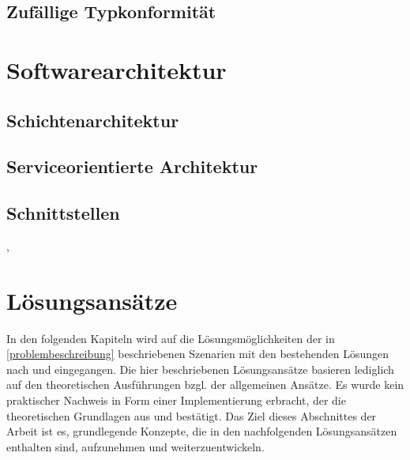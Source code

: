 \documentclass[11pt, 
ngerman,
doublespacing,
chapterinoneline, %
consistentlayout, %
]{scrartcl}
\begin{document}
\subsection{Zufällige Typkonformität}
\cite{structconfjava}
\section{Softwarearchitektur}
\cite{Bas13}
\subsection{Schichtenarchitektur}\label{architektur}
\cite{modanwendungen}
\subsection{Serviceorientierte Architektur}\label{sarchitektur}
\cite{modanwendungen}
\subsection{Schnittstellen}
\cite{Bas13}, \cite{Bus96}
\section{Lösungsansätze}
In den folgenden Kapiteln wird auf die Lösungsmöglichkeiten der in \ref{problembeschreibung} beschriebenen Szenarien mit den bestehenden Lösungen nach \cite{structconfjava} und \cite{whiteoak} eingegangen. Die hier beschriebenen Lösungsansätze basieren lediglich auf den theoretischen Ausführungen bzgl. der allgemeinen Ansätze. Es wurde kein praktischer Nachweis in Form einer Implementierung erbracht, der die theoretischen Grundlagen aus \cite{structconfjava} und \cite{whiteoak} bestätigt. Das Ziel dieses Abschnittes der Arbeit ist es, grundlegende Konzepte, die in den nachfolgenden Lösungsansätzen enthalten sind, aufzunehmen und weiterzuentwickeln.
\end{document}

